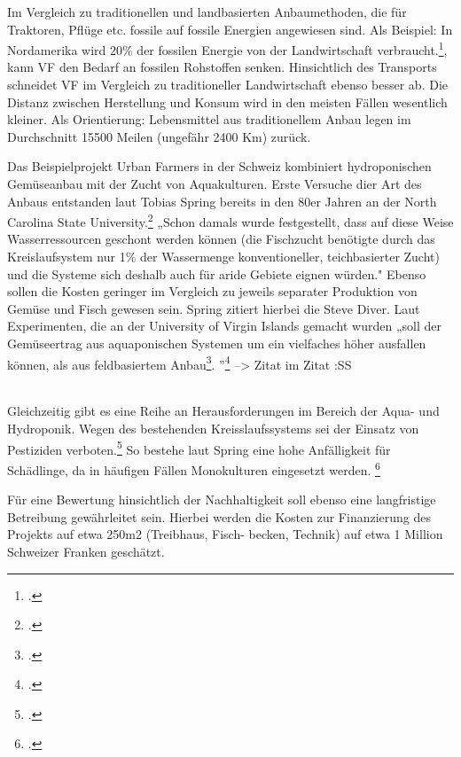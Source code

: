 \documentclass{scrartcl}
\begin{document}
Im Vergleich zu traditionellen und landbasierten Anbaumethoden, die für Traktoren, Pflüge etc. fossile auf fossile Energien angewiesen sind. Als Beispiel: In Nordamerika wird 20\% der fossilen Energie von der Landwirtschaft verbraucht.\footcite[Vgl.][S.27]{Al-Kodmany2018TheCity[82,83}, kann VF den Bedarf an fossilen Rohstoffen senken.
Hinsichtlich des Transports schneidet VF im Vergleich zu traditioneller Landwirtschaft ebenso besser ab. Die Distanz zwischen Herstellung und Konsum wird in den meisten Fällen wesentlich kleiner. Als Orientierung: Lebensmittel aus traditionellem Anbau legen im Durchschnitt 15500 Meilen (ungefähr 2400 Km) zurück.


Das Beispielprojekt Urban Farmers in der Schweiz kombiniert hydroponischen Gemüseanbau mit der Zucht von Aquakulturen. Erste Versuche dier Art des Anbaus entstanden laut Tobias Spring bereits in den 80er Jahren an der North Carolina State University.\footcite{Diver2006Aquaponics-IntegrationAquaculture} „Schon damals wurde festgestellt, dass auf diese Weise Wasserressourcen geschont werden können (die Fischzucht benötigte durch das Kreislaufsystem nur 1\% der Wassermenge konventioneller, teichbasierter Zucht) und die Systeme sich deshalb auch für aride Gebiete eignen würden." Ebenso sollen die Kosten geringer im Vergleich zu jeweils separater Produktion von Gemüse und Fisch gewesen sein. Spring zitiert hierbei die Steve Diver. Laut Experimenten, die an der University of Virgin Islands gemacht wurden „soll der Gemüseertrag aus aquaponischen Systemen um ein vielfaches höher ausfallen können, als aus feldbasiertem Anbau\footcite{Diver2006Aquaponics-IntegrationAquaculture}. ”\footcite[S.27]{TobiasSpringDerBasel-Stadt} --> Zitat im Zitat :SS

\\
Gleichzeitig gibt es eine Reihe an Herausforderungen im Bereich der Aqua- und Hydroponik.
Wegen des bestehenden Kreisslaufssystems sei der Einsatz von Pestiziden verboten.\footcite[]{FreiMatthiasHartmann2007AquaponikGemuse.}  So bestehe laut Spring eine hohe Anfälligkeit für Schädlinge, da in häufigen Fällen Monokulturen eingesetzt werden. \footcite[S.27]{TobiasSpringDerBasel-Stadt}

Für eine Bewertung hinsichtlich der Nachhaltigkeit soll ebenso eine langfristige Betreibung gewährleitet sein. Hierbei werden die Kosten zur Finanzierung des Projekts auf etwa 250m2 (Treibhaus, Fisch- becken, Technik) auf etwa 1 Million Schweizer Franken geschätzt.
\end{document}
